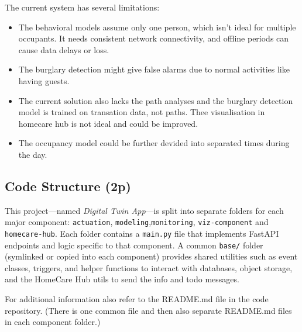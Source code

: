 \documentclass[A4,10pt]{article}
\begin{document}
The current system has several limitations:
\begin{itemize}
    \item The behavioral models assume only one person, which isn't ideal for multiple occupants. It needs consistent network connectivity, and offline periods can cause data delays or loss.
    \item The burglary detection might give false alarms due to normal activities like having guests.
    \item The current solution also lacks the path analyses and the burglary detection model is trained on transation data, not paths. Thee visualisation in homecare hub is not ideal and could be improved.
    \item The occupancy model could be further devided into separated times during the day.
\end{itemize}
\subsection{Code Structure (2p)}
\label{sec:code_structure}

This project---named \textit{Digital Twin App}---is split into separate folders for each major component: 
\texttt{actuation}, \texttt{modeling},\texttt{monitoring}, \texttt{viz-component} and \texttt{homecare-hub}. Each folder contains a \texttt{main.py} file
that implements FastAPI endpoints and logic specific to that component.
A common \texttt{base/} folder (symlinked or copied into each component) provides shared utilities 
such as event classes, triggers, and helper functions to interact with databases, object storage, 
and the HomeCare Hub utils to send the info and todo messages.

For additional information also refer to the README.md file in the code repository. (There is one common file and then also separate README.md files in each component folder.)
\end{document}

